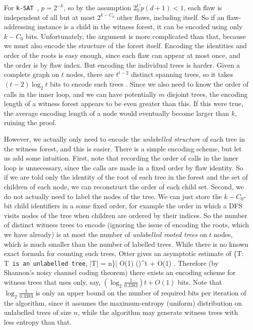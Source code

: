 \documentclass[twocolumn]{article}
\newcommand{\ksat}{\texttt{k-SAT}~}
\def\seqn#1\eeqn{\begin{align}#1\end{align}}
\begin{document}
For \ksat, $p = 2^{-k}$, so by the assumption $2^C_0 p (d+1) < 1$, each flaw is independent of all but at most $2^{k-C_0}$ other flaws, including itself.  So if an flaw-addressing instance is a child in the witness forest, it can be encoded using only $k-C_0$ bits.  Unfortunately, the argument is more complicated than that, because we must also encode the structure of the forest itself.  Encoding the identities and order of the roots is easy enough, since each flaw can appear at most once, and the order is by flaw index.  But encoding the individual trees is harder.  Given a complete graph on $t$ nodes, there are $t^{t-2}$ distinct spanning trees, so it takes $(t-2) \log_2 t$ bits to encode such trees \cite{prufer1918neuer,neville1953codifying}.  Since we also need to know the order of calls in the inner loop, and we can have potentially $m$ disjoint trees, the encoding length of a witness forest appears to be even greater than this.  If this were true, the average encoding length of a node would eventually become larger than $k$, ruining the proof.

However, we actually only need to encode the \emph{unlabelled structure} of each tree in the witness forest, and this is easier.  There is a simple encoding scheme, but let us add some intuition.  First, note that recording the order of calls in the inner loop is unnecessary, since the calls are made in a fixed order by flaw identity.  So if we are told only the identity of the root of each tree in the forest and the set of children of each node, we can reconstruct the order of each child set.  %
Second, we do not actually need to label the nodes of the tree.  We can just store the $k-C_0$-bit child identifiers in a some fixed order, for example the order in which a DFS visits nodes of the tree when children are ordered by their indices. %
So the number of distinct witness trees to encode (ignoring the issue of encoding the roots, which we have already) is at most the number of \emph{unlabelled rooted trees} on $t$ nodes, which is much smaller than the number of labelled trees.  While there is no known exact formula for counting such trees, Otter \cite{otter1948number} gives an asymptotic estimate of
\seqn
  |\{T: T\texttt{ is an unlabelled tree}, |T| = n\}| \tilde O(1) ()^t + O(1) .
\eeqn
Therefore (by Shannon's noisy channel coding theorem) there exists an encoding scheme for witness trees that uses only, say, $(\log_2 \frac{1}{0.3383}) t + O(1)$ bits.  Note that $\log_2 \frac{1}{0.3383}$ is only an upper bound on the number of required bits per iteration of the algorithm, since it assumes the maximum-entropy (uniform) distribution on unlabelled trees of size $n$, while the algorithm may generate witness trees with less entropy than that.
\end{document}
